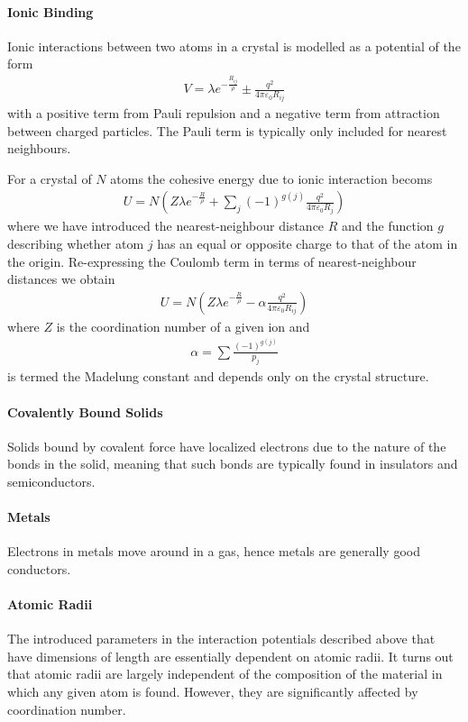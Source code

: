 \paragraph{Ionic Binding}
Ionic interactions between two atoms in a crystal is modelled as a potential of the form
\begin{align*}
	V = \lambda e^{-\frac{R_{ij}}{\rho}} \pm \frac{q^{2}}{4\pi\varepsilon_{0}R_{ij}}
\end{align*}
with a positive term from Pauli repulsion and a negative term from attraction between charged particles. The Pauli term is typically only included for nearest neighbours.

For a crystal of $N$ atoms the cohesive energy due to ionic interaction becoms
\begin{align*}
	U = N\left(Z\lambda e^{-\frac{R}{\rho}} + \sum\limits_{j}(-1)^{g(j)}\frac{q^{2}}{4\pi\varepsilon_{0}R_{j}}\right)
\end{align*}
where we have introduced the nearest-neighbour distance $R$ and the function $g$ describing whether atom  $j$ has an equal or opposite charge to that of the atom in the origin. Re-expressing the Coulomb term in terms of nearest-neighbour distances we obtain
\begin{align*}
	U = N\left(Z\lambda e^{-\frac{R}{\rho}} - \alpha\frac{q^{2}}{4\pi\varepsilon_{0}R_{ij}}\right)
\end{align*}
where $Z$ is the coordination number of a given ion and
\begin{align*}
	\alpha = \sum\limits\frac{(-1)^{g(j)}}{p_{j}}
\end{align*}
is termed the Madelung constant and depends only on the crystal structure.

\paragraph{Covalently Bound Solids}
Solids bound by covalent force have localized electrons due to the nature of the bonds in the solid, meaning that such bonds are typically found in insulators and semiconductors.

\paragraph{Metals}
Electrons in metals move around in a gas, hence metals are generally good conductors.

\paragraph{Atomic Radii}
The introduced parameters in the interaction potentials described above that have dimensions of length are essentially dependent on atomic radii. It turns out that atomic radii are largely independent of the composition of the material in which any given atom is found. However, they are significantly affected by coordination number.